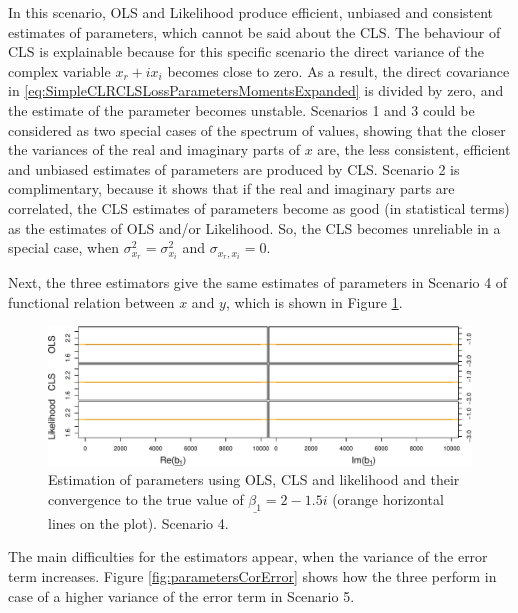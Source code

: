 \documentclass[
]{book}
\begin{document}
In this scenario, OLS and Likelihood produce efficient, unbiased and consistent estimates of parameters, which cannot be said about the CLS. The behaviour of CLS is explainable because for this specific scenario the direct variance of the complex variable \(x_r + i x_i\) becomes close to zero. As a result, the direct covariance in \eqref{eq:SimpleCLRCLSLossParametersMomentsExpanded} is divided by zero, and the estimate of the parameter becomes unstable. Scenarios 1 and 3 could be considered as two special cases of the spectrum of values, showing that the closer the variances of the real and imaginary parts of \(x\) are, the less consistent, efficient and unbiased estimates of parameters are produced by CLS. Scenario 2 is complimentary, because it shows that if the real and imaginary parts are correlated, the CLS estimates of parameters become as good (in statistical terms) as the estimates of OLS and/or Likelihood. So, the CLS becomes unreliable in a special case, when \(\sigma_{x_r}^2 = \sigma_{x_i}^2\) and \(\sigma_{x_r,x_i}=0\).

Next, the three estimators give the same estimates of parameters in Scenario 4 of functional relation between \(x\) and \(y\), which is shown in Figure \ref{fig:parametersFR}.

\begin{figure}
\centering
\includegraphics{Svetunkov---Svetunkov---Complex-Dynamic-Models_files/figure-latex/parametersFR-1.pdf}
\caption{\label{fig:parametersFR}Estimation of parameters using OLS, CLS and likelihood and their convergence to the true value of \(\underline{\beta_1}=2-1.5i\) (orange horizontal lines on the plot). Scenario 4.}
\end{figure}

The main difficulties for the estimators appear, when the variance of the error term increases. Figure \ref{fig:parametersCorError} shows how the three perform in case of a higher variance of the error term in Scenario 5.
\end{document}
